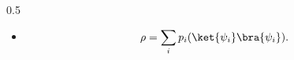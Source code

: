 \begin{frame}
\begin{columns}
        \begin{column}{0.5\textwidth} %
            \justifying %
            \tiny %
                \begin{itemize}
                    \item[] 
                        \begin{equation}
                            \rho=\sum_{i} p_i(\ket{\psi_i}\bra{\psi_i}).
                            \label{Matriks densitas}
                        \end{equation}
                \end{itemize}
        \end{column}
    \end{columns}
\end{frame}

